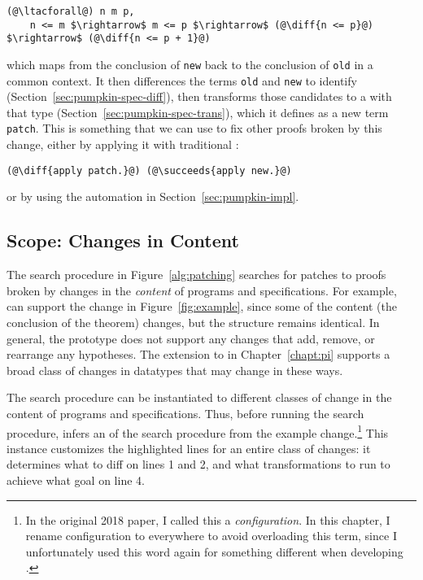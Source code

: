 \begin{lstlisting}[language=coq]
  (@\ltacforall@) n m p,
    n <= m $\rightarrow$ m <= p $\rightarrow$ (@\diff{n <= p}@) $\rightarrow$ (@\diff{n <= p + 1}@)
\end{lstlisting}
which maps from the conclusion of \lstinline{new} back to the conclusion of \lstinline{old} in a common context.
It then differences the terms \lstinline{old} and \lstinline{new} to identify  (Section~\ref{sec:pumpkin-spec-diff}),
then transforms those candidates to a  with that type (Section~\ref{sec:pumpkin-spec-trans}),
which it defines as a new term \lstinline{patch}.
This is something that we can use to fix other proofs broken by this change, either by applying it with traditional :

\begin{lstlisting}[language=coq]
  (@\diff{apply patch.}@) (@\succeeds{apply new.}@)
\end{lstlisting}
or by using the automation in Section~\ref{sec:pumpkin-impl}.

\subsection{Scope: Changes in Content}
\label{sec:pumpkin-scope}

The search procedure in Figure~\ref{alg:patching} searches for patches to proofs broken by changes in the \textit{content} of programs and specifications.
For example, \sysname can support the change in Figure~\ref{fig:example}, since some of the content (the conclusion of the theorem) changes,
but the structure remains identical.
In general, the \sysname prototype does not support any changes that add, remove, or rearrange any hypotheses.
The \toolnamec extension to \sysnamelong in Chapter~\ref{chapt:pi} supports a broad class of changes
in datatypes that may change in these ways.

The search procedure can be instantiated to different classes of change in the content of programs and specifications.
Thus, before running the search procedure, \sysname infers an  of the search 
procedure from the example change.\footnote{In the original 2018 \sysnamelong paper, I called this a \textit{configuration}.
In this chapter, I rename configuration to  everywhere to avoid overloading this term,
since I unfortunately used this word again for something different when developing \toolnamec.}
This instance customizes the highlighted lines for an entire class of changes:
it determines what to diff on lines 1 and 2,
and what transformations to run to achieve what goal on line 4.

